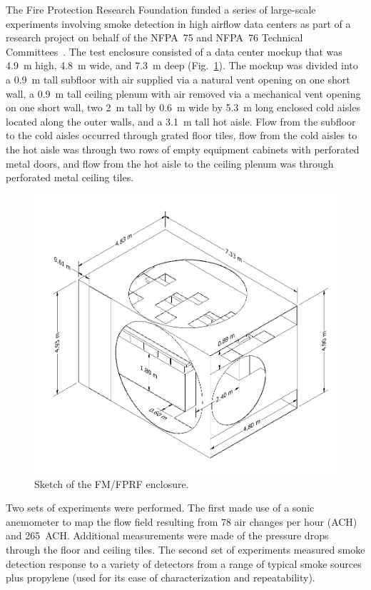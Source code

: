 The Fire Protection Research Foundation funded a series of large-scale experiments involving smoke detection in high airflow data centers as part of a research project on behalf of the NFPA~75 and NFPA~76 Technical Committees~\cite{FM_Datacenter_Rpt}. The test enclosure consisted of a data center mockup that was 4.9~m high, 4.8~m wide, and 7.3~m deep (Fig.~\ref{ServerRackSim_Sketch}). The mockup was divided into a 0.9~m tall subfloor with air supplied via a natural vent opening on one short wall, a 0.9~m tall ceiling plenum with air removed via a mechanical vent opening on one short wall, two 2~m tall by 0.6~m wide by 5.3~m long enclosed cold aisles located along the outer walls, and a 3.1~m tall hot aisle. Flow from the subfloor to the cold aisles occurred through grated floor tiles, flow from the cold aisles to the hot aisle was through two rows of empty equipment cabinets with perforated metal doors, and flow from the hot aisle to the ceiling plenum was through perforated metal ceiling tiles.

\begin{figure}[!ht]
\includegraphics[width=\textwidth]{FIGURES/FM_FPRF_Datacenter/ServerRackSim}
\caption[Sketch of the FM/FPRF enclosure]{Sketch of the FM/FPRF enclosure.}
\label{ServerRackSim_Sketch}
\end{figure}

Two sets of experiments were performed. The first made use of a sonic anemometer to map the flow field resulting from 78 air changes per hour (ACH) and 265~ACH. Additional measurements were made of the pressure drops through the floor and ceiling tiles. The second set of experiments measured smoke detection response to a variety of detectors from a range of typical smoke sources plus propylene (used for its ease of characterization and repeatability).

